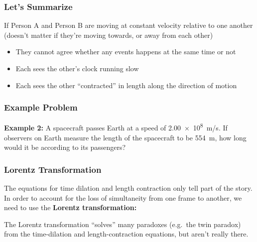 \documentclass[12pt,compress,aspectratio=169]{beamer}
\begin{document}
\begin{frame}
  \frametitle{Let's Summarize}
  \begin{center}
  \end{center}
  If Person A and Person B are moving at constant velocity relative to one 
  another (doesn't matter if they're moving towards, or away from each other)
  \begin{itemize}
  \item They cannot agree whether any events happens at the same time or not
  \item Each sees the other's clock running slow
  \item Each sees the other ``contracted'' in length along the direction of
    motion
  \end{itemize}
\end{frame}

\begin{frame}
  \frametitle{Example Problem}
  \textbf{Example 2:} A spacecraft passes Earth at a speed of \SI{2.00e8}{m/s}.
  If observers on Earth measure the length of the spacecraft to be
  \SI{554}{m}, how long would it be according to its passengers?
\end{frame}


\begin{frame}
  \frametitle{Lorentz Transformation}
  The equations for time dilation and length contraction only tell part of the
  story. In order to account for the loss of simultaneity from one frame to
  another, we need to use the \textbf{Lorentz transformation:}

  
  \vspace{-.1in}The Lorentz transformation ``solves'' many paradoxes
  (e.g.\ the twin paradox) from the time-dilation and
  length-contraction equations, but aren't really there.
\end{frame}
\end{document}
